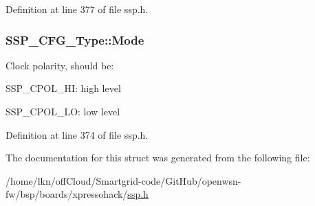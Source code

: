 Definition at line 377 of file ssp.\+h.

\subsubsection[{\texorpdfstring{Mode}{Mode}}]{ S\+S\+P\+\_\+\+C\+F\+G\+\_\+\+Type\+::\+Mode}\hypertarget{struct_s_s_p___c_f_g___type_a1d6f2a353259308dd2f289b88a59742a}{}\label{struct_s_s_p___c_f_g___type_a1d6f2a353259308dd2f289b88a59742a}
Clock polarity, should be\+:
\begin{DoxyItemize}
\item S\+S\+P\+\_\+\+C\+P\+O\+L\+\_\+\+HI\+: high level
\item S\+S\+P\+\_\+\+C\+P\+O\+L\+\_\+\+LO\+: low level 
\end{DoxyItemize}

Definition at line 374 of file ssp.\+h.



The documentation for this struct was generated from the following file\+:\begin{DoxyCompactItemize}
\item 
/home/lkn/off\+Cloud/\+Smartgrid-\/code/\+Git\+Hub/openwsn-\/fw/bsp/boards/xpressohack/\hyperlink{ssp_8h}{ssp.\+h}\end{DoxyCompactItemize}

